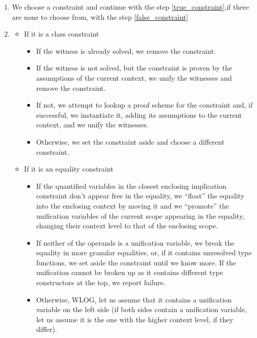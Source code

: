 \begin{enumerate}
    \item We choose a constraint and continue with the step \ref{true_constraint},if there are none to choose from, with the step \ref{false_constraint} \label{choose_constraint}

    \item \label{true_constraint}
    \begin{itemize}
        \item If it is a class constraint

        \begin{itemize}
            \item If the witness is already solved, we remove the constraint.

            \item If the witness is not solved, but the constraint is proven by the assumptions of the current context, we unify the witnesses and remove the constraint.

            \item If not, we attempt to lookup a proof scheme for the constraint and, if successful, we instantiate it, adding its assumptions to the current context, and we unify the witnesses.

            \item Otherwise, we set the constraint aside and choose a different constraint.
        \end{itemize}

        \item If it is an equality constraint

        \begin{itemize}
            \item If the quantified variables in the closest enclosing implication constraint don't appear free in the equality, we ``float'' the equality into the enclosing context by moving it and we ``promote'' the unification variables of the current scope appearing in the equality, changing their context level to that of the enclosing scope.

            \item If neither of the operands is a unification variable, we break the equality in more granular equalities, or, if it contains unresolved type functions, we set aside the constraint until we know more. If the unification cannot be broken up as it contains different type constructors at the top, we report failure.

            \item Otherwise, WLOG, let us assume that it contains a unification variable on the left side (if both sides contain a unification variable, let us assume it is the one with the higher context level, if they differ).


\end{itemize}
\end{itemize}
\end{enumerate}
